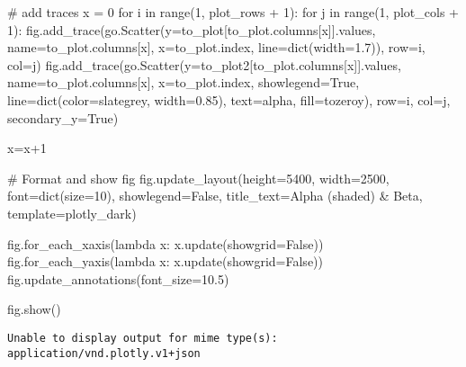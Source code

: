 \documentclass[
  letterpaper,
  DIV=11,
  numbers=noendperiod]{scrartcl}
\newenvironment{Shaded}{\begin{snugshade}}{\end{snugshade}}
\newcommand{\BuiltInTok}[1]{\textcolor[rgb]{0.00,0.23,0.31}{#1}}
\newcommand{\CommentTok}[1]{\textcolor[rgb]{0.37,0.37,0.37}{#1}}
\newcommand{\ControlFlowTok}[1]{\textcolor[rgb]{0.00,0.23,0.31}{#1}}
\newcommand{\DecValTok}[1]{\textcolor[rgb]{0.68,0.00,0.00}{#1}}
\newcommand{\FloatTok}[1]{\textcolor[rgb]{0.68,0.00,0.00}{#1}}
\newcommand{\KeywordTok}[1]{\textcolor[rgb]{0.00,0.23,0.31}{#1}}
\newcommand{\NormalTok}[1]{\textcolor[rgb]{0.00,0.23,0.31}{#1}}
\newcommand{\OperatorTok}[1]{\textcolor[rgb]{0.37,0.37,0.37}{#1}}
\newcommand{\StringTok}[1]{\textcolor[rgb]{0.13,0.47,0.30}{#1}}
\newcommand{\VariableTok}[1]{\textcolor[rgb]{0.07,0.07,0.07}{#1}}
\begin{document}
\begin{Shaded}
\begin{Highlighting}[]
\CommentTok{\# add traces}
\NormalTok{x }\OperatorTok{=} \DecValTok{0}
\ControlFlowTok{for}\NormalTok{ i }\KeywordTok{in} \BuiltInTok{range}\NormalTok{(}\DecValTok{1}\NormalTok{, plot\_rows }\OperatorTok{+} \DecValTok{1}\NormalTok{):}
    \ControlFlowTok{for}\NormalTok{ j }\KeywordTok{in} \BuiltInTok{range}\NormalTok{(}\DecValTok{1}\NormalTok{, plot\_cols }\OperatorTok{+} \DecValTok{1}\NormalTok{):}
\NormalTok{        fig.add\_trace(go.Scatter(y}\OperatorTok{=}\NormalTok{to\_plot[to\_plot.columns[x]].values, name}\OperatorTok{=}\NormalTok{to\_plot.columns[x], x}\OperatorTok{=}\NormalTok{to\_plot.index, line}\OperatorTok{=}\BuiltInTok{dict}\NormalTok{(width}\OperatorTok{=}\FloatTok{1.7}\NormalTok{)), }
\NormalTok{                     row}\OperatorTok{=}\NormalTok{i, col}\OperatorTok{=}\NormalTok{j)}
\NormalTok{        fig.add\_trace(go.Scatter(y}\OperatorTok{=}\NormalTok{to\_plot2[to\_plot.columns[x]].values, name}\OperatorTok{=}\NormalTok{to\_plot.columns[x], x}\OperatorTok{=}\NormalTok{to\_plot.index, showlegend}\OperatorTok{=}\VariableTok{True}\NormalTok{, line}\OperatorTok{=}\BuiltInTok{dict}\NormalTok{(color}\OperatorTok{=}\StringTok{\textquotesingle{}slategrey\textquotesingle{}}\NormalTok{, width}\OperatorTok{=}\FloatTok{0.85}\NormalTok{), text}\OperatorTok{=}\StringTok{\textquotesingle{}alpha\textquotesingle{}}\NormalTok{, fill}\OperatorTok{=}\StringTok{\textquotesingle{}tozeroy\textquotesingle{}}\NormalTok{),}
\NormalTok{                     row}\OperatorTok{=}\NormalTok{i, col}\OperatorTok{=}\NormalTok{j, secondary\_y}\OperatorTok{=}\VariableTok{True}\NormalTok{)}

\NormalTok{        x}\OperatorTok{=}\NormalTok{x}\OperatorTok{+}\DecValTok{1}

\CommentTok{\# Format and show fig}
\NormalTok{fig.update\_layout(height}\OperatorTok{=}\DecValTok{5400}\NormalTok{, width}\OperatorTok{=}\DecValTok{2500}\NormalTok{, font}\OperatorTok{=}\BuiltInTok{dict}\NormalTok{(size}\OperatorTok{=}\DecValTok{10}\NormalTok{), showlegend}\OperatorTok{=}\VariableTok{False}\NormalTok{, title\_text}\OperatorTok{=}\StringTok{\textquotesingle{}Alpha (shaded) \& Beta\textquotesingle{}}\NormalTok{, template}\OperatorTok{=}\StringTok{\textquotesingle{}plotly\_dark\textquotesingle{}}\NormalTok{)}

\NormalTok{fig.for\_each\_xaxis(}\KeywordTok{lambda}\NormalTok{ x: x.update(showgrid}\OperatorTok{=}\VariableTok{False}\NormalTok{))}
\NormalTok{fig.for\_each\_yaxis(}\KeywordTok{lambda}\NormalTok{ x: x.update(showgrid}\OperatorTok{=}\VariableTok{False}\NormalTok{))}
\NormalTok{fig.update\_annotations(font\_size}\OperatorTok{=}\FloatTok{10.5}\NormalTok{)}

\NormalTok{fig.show()}
\end{Highlighting}
\end{Shaded}

\begin{verbatim}
Unable to display output for mime type(s): application/vnd.plotly.v1+json
\end{verbatim}
\end{document}
